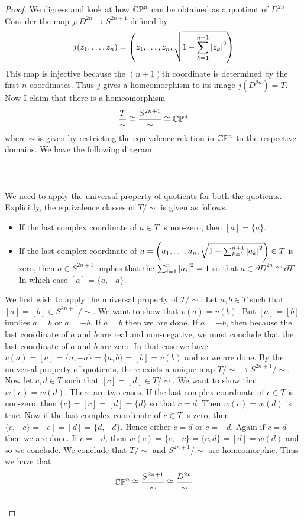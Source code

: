 \documentclass[a4paper]{article}
\begin{document}
\begin{prp}{}{}
\begin{proof}
We digress and look at how $\mathbb{C}\mathbb{P}^n$ can be obtained as a quotient of $D^{2n}$. Consider the map $j:D^{2n}\to S^{2n+1}$ defined by $$j(z_1,\dots,z_n)=\left(z_1,\dots,z_n,\sqrt{1-\sum_{k=1}^{n+1}\abs{z_k}^2}\right)$$ This map is injective because the $(n+1)$th coordinate is determined by the first $n$ coordinates. Thus $j$ gives a homeomorphism to its image $j(D^{2n})=T$. Now I claim that there is a homeomorphism $$\frac{T}{\sim}\cong\frac{S^{2n+1}}{\sim}\cong\mathbb{C}\mathbb{P}^n$$ where $\sim$ is given by restricting the equivalence relation in $\mathbb{C}\mathbb{P}^n$ to the respective domains. We have the following diagram: \\~\\
\\~\\
We need to apply the universal property of quotients for both the quotients. Explicitly, the equivalence classes of $T/\sim$ is given as follows. 
\begin{itemize}
\item If the last complex coordinate of $a\in T$ is non-zero, then $[a]=\{a\}$. 
\item If the last complex coordinate of $a=\left(a_1,\dots,a_n,\sqrt{1-\sum_{k=1}^{n+1}\abs{a_k}^2}\right)\in T$ is zero, then $a\in S^{2n+1}$ implies that the $\sum_{i=1}^n\abs{a_i}^2=1$ so that $a\in\partial D^{2n}\cong\partial T$. In which case $[a]=\{a,-a\}$. 
\end{itemize}
We first wish to apply the universal property of $T/\sim$. Let $a,b\in T$ such that $[a]=[b]\in S^{2n+1}/\sim$. We want to show that $v(a)=v(b)$. But $[a]=[b]$ implies $a=b$ or $a=-b$. If $a=b$ then we are done. If $a=-b$, then because the last coordinate of $a$ and $b$ are real and non-negative, we must conclude that the last coordinate of $a$ and $b$ are zero. In that case we have $v(a)=[a]=\{a,-a\}=\{a,b\}=[b]=v(b)$ and so we are done. By the universal property of quotients, there exists a unique map $T/\sim\to S^{2n+1}/\sim$. Now let $c,d\in T$ such that $[c]=[d]\in T/\sim$. We want to show that $w(c)=w(d)$. There are two cases. If the last complex coordinate of $c\in T$ is non-zero, then $\{c\}=[c]=[d]=\{d\}$ so that $c=d$. Then $w(c)=w(d)$ is true. Now if the last complex coordinate of $c\in T$ is zero, then $\{c,-c\}=[c]=[d]=\{d,-d\}$. Hence either $c=d$ or $c=-d$. Again if $c=d$ then we are done. If $c=-d$, then $w(c)=\{c,-c\}=\{c,d\}=[d]=w(d)$ and so we conclude. We conclude that $T/\sim$ and $S^{2n+1}/\sim$ are homeomorphic. Thus we have that $$\mathbb{C}\mathbb{P}^n\cong\frac{S^{2n+1}}{\sim}\cong\frac{D^{2n}}{\sim}$$~\\


\end{proof}
\end{prp}
\end{document}
